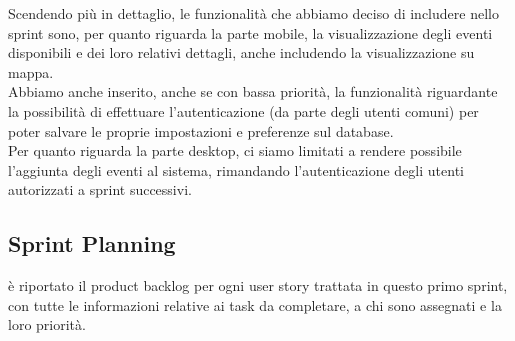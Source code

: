 \documentclass{article}
\begin{document}
Scendendo più in dettaglio, le funzionalità che abbiamo deciso di includere nello sprint sono, per quanto riguarda la parte mobile, la visualizzazione degli eventi disponibili e dei loro relativi dettagli, anche includendo la visualizzazione su mappa.\\
Abbiamo anche inserito, anche se con bassa priorità, la funzionalità riguardante la possibilità di effettuare l'autenticazione (da parte degli utenti comuni) per poter salvare le proprie impostazioni e preferenze sul database.\\
Per quanto riguarda la parte desktop, ci siamo limitati a rendere possibile l'aggiunta degli eventi al sistema, rimandando l'autenticazione degli utenti autorizzati a sprint successivi.

\subsection{Sprint Planning}
è riportato il product backlog per ogni user story trattata in questo primo sprint, con tutte le informazioni relative ai task da completare, a chi sono assegnati e la loro priorità.\\
\end{document}

